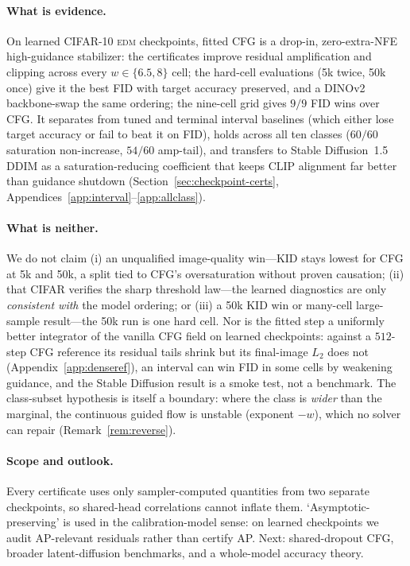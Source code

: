 \documentclass{article} %
\theoremstyle{plain}
\theoremstyle{definition}
\theoremstyle{remark}
\begin{document}
\paragraph{What is evidence.}
On learned CIFAR-10 \textsc{edm} checkpoints, fitted CFG is a drop-in,
zero-extra-NFE high-guidance stabilizer: the certificates improve residual
amplification and clipping across every $w\in\{6.5,8\}$ cell; the hard-cell
evaluations (5k twice, 50k once) give it the best FID with target accuracy
preserved, and a DINOv2 backbone-swap the same ordering; the nine-cell grid
gives $9/9$ FID wins over CFG.  It separates from tuned and terminal interval
baselines (which either lose target accuracy or fail to beat it on FID), holds
across all ten classes ($60/60$ saturation non-increase, $54/60$ amp-tail), and
transfers to Stable Diffusion~1.5 DDIM as a saturation-reducing coefficient that
keeps CLIP alignment far better than guidance shutdown
(Section~\ref{sec:checkpoint-certs}, Appendices~\ref{app:interval}--\ref{app:allclass}).

\paragraph{What is neither.}
We do not claim (i) an unqualified image-quality win---KID stays lowest for
CFG at 5k and 50k, a split tied to CFG's oversaturation without proven
causation; (ii) that CIFAR verifies the sharp threshold law---the learned
diagnostics are only \emph{consistent with} the model ordering; or (iii) a 50k
KID win or many-cell large-sample result---the 50k run is one hard cell.  Nor
is the fitted step a uniformly better integrator of the vanilla CFG field on
learned checkpoints: against a $512$-step CFG reference its residual tails shrink
but its final-image $L_2$ does not (Appendix~\ref{app:denseref}), an interval can
win FID in some cells by weakening guidance, and the Stable Diffusion result is a
smoke test, not a benchmark.  The class-subset hypothesis is itself a boundary:
where the class is \emph{wider} than the marginal, the continuous guided flow is
unstable (exponent $-w$), which no solver can repair (Remark~\ref{rem:reverse}).

\paragraph{Scope and outlook.}
Every certificate uses only sampler-computed quantities from two separate
checkpoints, so shared-head correlations cannot inflate them.
`Asymptotic-preserving' is used in the calibration-model sense: on learned
checkpoints we audit AP-relevant residuals rather than certify AP.  Next:
shared-dropout CFG, broader latent-diffusion benchmarks, and a whole-model
accuracy theory.
\end{document}
